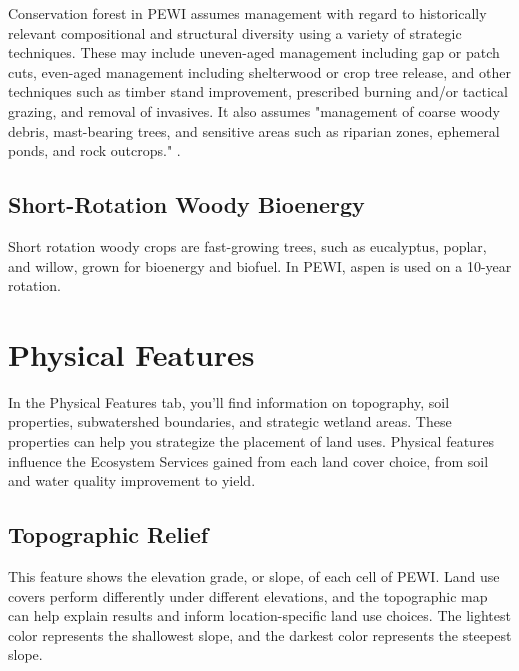 \documentclass[11pt]{article}
\begin{document}
Conservation forest in PEWI assumes management with regard to historically relevant compositional and structural diversity using a variety of strategic techniques. These may include uneven-aged management including gap or patch cuts, even-aged management including shelterwood or crop tree release, and other techniques such as timber stand improvement, prescribed burning and/or tactical grazing, and removal of invasives.\cite{22}  It also assumes "management of coarse woody debris, mast-bearing trees, and sensitive areas such as riparian zones, ephemeral ponds, and rock outcrops." .\cite{23}


\subsection{Short-Rotation Woody Bioenergy}
Short rotation woody crops are fast-growing trees, such as eucalyptus, poplar, and willow, grown for bioenergy and biofuel. In PEWI, aspen is used on a 10-year rotation.

\newpage
\section{Physical Features}\label{sec:physicalfeatures}
In the Physical Features tab, you'll find information on topography, soil properties, subwatershed boundaries, and strategic wetland areas. These properties can help you strategize the placement of land uses. Physical features influence the Ecosystem Services gained from each land cover choice, from soil and water quality improvement to yield.

\subsection{Topographic Relief}
This feature shows the elevation grade, or slope, of each cell of PEWI. Land use covers perform differently under different elevations, and the topographic map can help explain results and inform location-specific land use choices. The lightest color represents the shallowest slope, and the darkest color represents the steepest slope.
\end{document}
